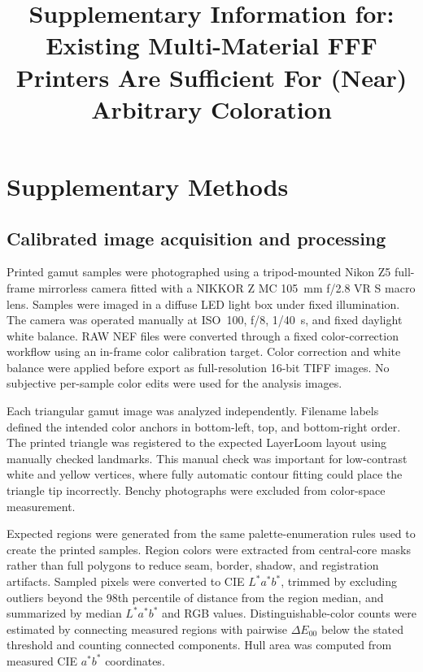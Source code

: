 \documentclass[preprint,12pt,authoryear]{elsarticle}
\begin{document}
\begin{frontmatter}

\title{Supplementary Information for:\\ Existing Multi-Material FFF Printers Are Sufficient For (Near) Arbitrary Coloration}

\end{frontmatter}

\section*{Supplementary Methods}

\subsection*{Calibrated image acquisition and processing}

Printed gamut samples were photographed using a tripod-mounted Nikon Z5 full-frame mirrorless camera fitted with a NIKKOR Z MC 105~mm f/2.8 VR S macro lens. Samples were imaged in a diffuse LED light box under fixed illumination. The camera was operated manually at ISO~100, f/8, 1/40~s, and fixed daylight white balance. RAW NEF files were converted through a fixed color-correction workflow using an in-frame color calibration target. Color correction and white balance were applied before export as full-resolution 16-bit TIFF images. No subjective per-sample color edits were used for the analysis images.

Each triangular gamut image was analyzed independently. Filename labels defined the intended color anchors in bottom-left, top, and bottom-right order. The printed triangle was registered to the expected LayerLoom layout using manually checked landmarks. This manual check was important for low-contrast white and yellow vertices, where fully automatic contour fitting could place the triangle tip incorrectly. Benchy photographs were excluded from color-space measurement.

Expected regions were generated from the same palette-enumeration rules used to create the printed samples. Region colors were extracted from central-core masks rather than full polygons to reduce seam, border, shadow, and registration artifacts. Sampled pixels were converted to CIE \(L^*a^*b^*\), trimmed by excluding outliers beyond the 98th percentile of distance from the region median, and summarized by median \(L^*a^*b^*\) and RGB values. Distinguishable-color counts were estimated by connecting measured regions with pairwise \(\Delta E_{00}\) below the stated threshold and counting connected components. Hull area was computed from measured CIE \(a^*b^*\) coordinates.
\end{document}
